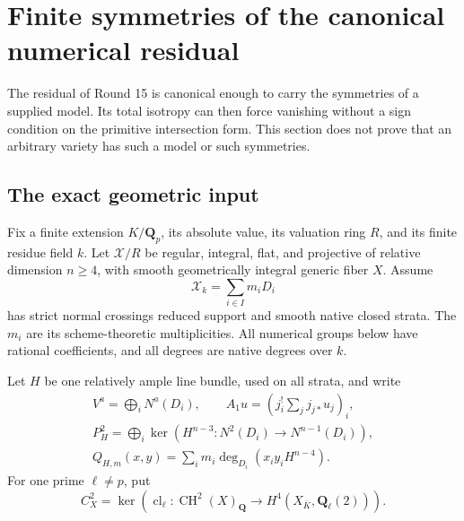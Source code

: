 \section{Finite symmetries of the canonical numerical residual}
\label{r16sym:section}

The residual of Round 15 is canonical enough to carry the symmetries
of a supplied model.  Its total isotropy can then force vanishing
without a sign condition on the primitive intersection form.  This
section does not prove that an arbitrary variety has such a model
or such symmetries.

\subsection{The exact geometric input}

Fix a finite extension $K/\mathbf Q_p$, its absolute value, its
valuation ring $R$, and its finite residue field $k$.  Let
$\mathcal X/R$ be regular, integral, flat, and projective of
relative dimension $n\geq4$, with smooth geometrically integral generic fiber
$X$.  Assume
\[
                  \mathcal X_k=\sum_{i\in I}m_iD_i
\tag{ER16.1}\label{r16sym:special-fiber}
\]
has strict normal crossings reduced support and smooth native
closed strata.  The $m_i$ are its scheme-theoretic multiplicities.
All numerical groups below have rational coefficients, and all
degrees are native degrees over $k$.

Let $H$ be one relatively ample line bundle, used on all strata,
and write
\[
\begin{gathered}
 V^a=\bigoplus_iN^a(D_i),\qquad
 A_1u=\left(j_i^!\sum_jj_{j*}u_j\right)_i,\\
 P_H^2=\bigoplus_i\ker\left(
     H^{n-3}:N^2(D_i)\longrightarrow N^{n-1}(D_i)\right),\\
 Q_{H,m}(x,y)=\sum_i m_i\deg_{D_i}(x_iy_iH^{n-4}).
\end{gathered}
\tag{ER16.2}\label{r16sym:numerical-data}
\]
For one prime $\ell\ne p$, put
\[
 C_X^2=\ker\left(\operatorname{cl}_\ell:
     \operatorname{CH}^2(X)_{\mathbf Q}
       \longrightarrow H^4(X_{\bar K},\mathbf Q_\ell(2))\right).
\]

